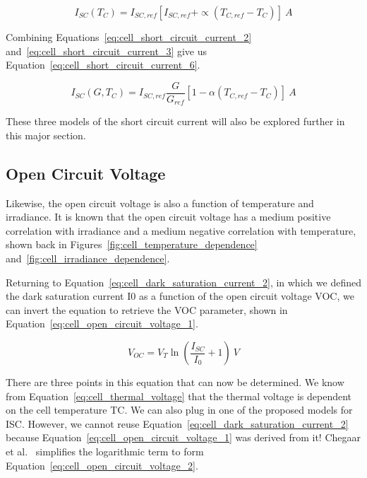 \begin{equation}
    I_{SC}(T_C) = I_{SC,ref}[I_{SC,ref} + \propto (T_{C,ref} - T_C)]~A
    \label{eq:cell_short_circuit_current_5}
\end{equation}

Combining Equations~\ref{eq:cell_short_circuit_current_2}
and~\ref{eq:cell_short_circuit_current_3} give us
Equation~\ref{eq:cell_short_circuit_current_6}.

\begin{equation}
    I_{SC}(G, T_C) = I_{SC,ref}\frac{G}{G_{ref}}[1 - \alpha(T_{C,ref} - T_C)]~A
    \label{eq:cell_short_circuit_current_6}
\end{equation}

These three models of the short circuit current will also be explored further in
this major section.

\subsection*{Open Circuit Voltage}

Likewise, the open circuit voltage is also a function of temperature and
irradiance. It is known that the open circuit voltage has a medium positive
correlation with irradiance and a medium negative correlation with temperature,
shown back in Figures~\ref{fig:cell_temperature_dependence}
and~\ref{fig:cell_irradiance_dependence}.

Returning to Equation~\ref{eq:cell_dark_saturation_current_2}, in which we
defined the dark saturation current \ac{I0} as a function of the open circuit
voltage \ac{VOC}, we can invert the equation to retrieve the \ac{VOC} parameter,
shown in Equation~\ref{eq:cell_open_circuit_voltage_1}.

\begin{equation}
    V_{OC} = V_T\ln(\frac{I_{SC}}{I_0} + 1)~V
    \label{eq:cell_open_circuit_voltage_1}
\end{equation}

There are three points in this equation that can now be determined. We know from
Equation~\ref{eq:cell_thermal_voltage} that the thermal voltage is dependent on
the cell temperature \ac{TC}. We can also plug in one of the proposed models for
\ac{ISC}. However, we cannot reuse
Equation~\ref{eq:cell_dark_saturation_current_2} because
Equation~\ref{eq:cell_open_circuit_voltage_1} was derived from it! Chegaar et
al.~\cite{chegaar_et_al} simplifies the logarithmic term to form
Equation~\ref{eq:cell_open_circuit_voltage_2}.

